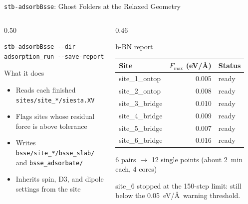\documentclass[8pt]{beamer}
\begin{document}
\begin{frame}[fragile]{\texttt{stb-adsorbBsse}: Ghost Folders at the Relaxed Geometry}
	\begin{columns}[T]
		\begin{column}{0.50\textwidth}
			{\scriptsize
\begin{verbatim}
stb-adsorbBsse --dir adsorption_run --save-report
\end{verbatim}
			}
			\begin{block}{What it does}
				\begin{itemize}
					\item Reads each finished \texttt{sites/site\_*/siesta.XV}
					\item Flags sites whose residual force is above tolerance
					\item Writes \texttt{bsse/site\_*/bsse\_slab/} and \texttt{bsse\_adsorbate/}
					\item Inherits spin, D3, and dipole settings from the site
				\end{itemize}
			\end{block}
		\end{column}
		\begin{column}{0.46\textwidth}
			\begin{block}{h-BN report}
				\centering\small
				\begin{tabular}{lrl}
					\toprule
					Site & $F_{\max}$ (eV/\AA) & Status \\
					\midrule
					site\_1\_ontop  & 0.005 & ready \\
					site\_2\_ontop  & 0.008 & ready \\
					site\_3\_bridge & 0.010 & ready \\
					site\_4\_bridge & 0.009 & ready \\
					site\_5\_bridge & 0.007 & ready \\
					site\_6\_bridge & \textcolor{stborange}{0.016} & ready \\
					\bottomrule
				\end{tabular}
				\par\vspace{0.1cm}
				{\scriptsize 6 pairs $\rightarrow$ 12 single points (about 2~min each, 4 cores)}
			\end{block}
			{\scriptsize site\_6 stopped at the 150-step limit: still below the
			0.05~eV/\AA\ warning threshold.}
		\end{column}
	\end{columns}
\end{frame}
\end{document}
